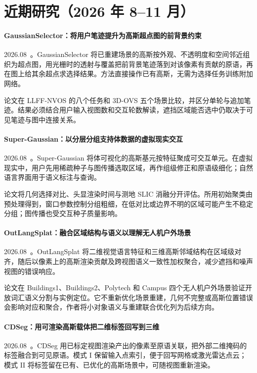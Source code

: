 \section{近期研究（2026 年 8--11 月）}
\paragraph{GaussianSelector：将用户笔迹提升为高斯超点图的前背景约束}
2026.08~\cite{2608_01492}。GaussianSelector 将已重建场景的高斯按外观、不透明度和空间邻近组织为超点图，用光栅时的透射与覆盖把前背景笔迹落到对该像素有贡献的原语，再在图上给其余超点求选择结果。方法直接操作已有高斯，无需为选择任务训练附加网络。

论文在 LLFF-NVOS 的八个任务和 3D-OVS 五个场景比较，并区分单轮与追加笔迹。结果必须结合用户输入视图数和交互轮数解读，遮挡区域能否选中仍取决于可见笔迹与图中连接关系。

\paragraph{Super-Gaussian：以分层分组支持体数据的虚拟现实交互}
2026.08~\cite{2608_04475}。Super-Gaussian 将体可视化的高斯基元按特征聚成可交互单元。在虚拟现实中，用户先用稀疏种子与图传播选取区域，再作组级修正和原语级细化；自然语言界面用于语义标注与查询。

论文将几何选择对比、头显渲染时间与测地 SLIC 消融分开评估。所用初始聚类由预处理得到，窗口参数控制分组粗细，在低对比或边界不明的区域可能产生不稳定分组；图传播也受交互种子质量影响。

\paragraph{OutLangSplat：融合区域结构与语义以理解无人机户外场景}
2026.08~\cite{2608_04560}。OutLangSplat 将二维视觉语言特征和三维高斯邻域结构在区域级对齐，随后以像素上的高斯渲染贡献及跨视图语义一致性加权聚合，减少遮挡和噪声视图的错误响应。

论文在 Buildings1、Buildings2、Polytech 和 Campus 四个无人机户外场景验证开放词汇语义分割与实例定位。它不重新优化场景重建，几何不完整或高斯位置错误会影响对应和聚合，作者将小对象语义与重建联合优化列为后续方向。

\paragraph{CDSeg：用可渲染高斯载体把二维标签回写到三维}
2026.08~\cite{2608_05482}。CDSeg 用已标定视图渲染产出的像素至原语关联，把外部二维掩码的标签融合到可见原语。模式 I 保留输入点索引，便于回写网格或激光雷达点云；模式 II 将标签留在已有、已优化的高斯场景中，可随视图重新渲染。

